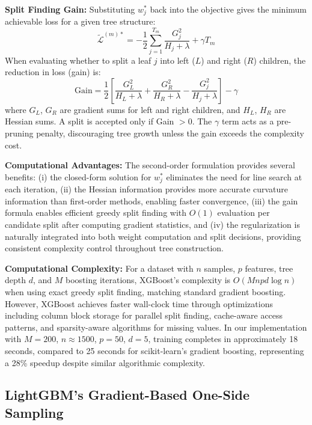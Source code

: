 \documentclass[10pt,twocolumn]{article}
\begin{document}
\textbf{Split Finding Gain:} Substituting $w_j^*$ back into the objective gives the minimum achievable loss for a given tree structure:
\begin{equation}
\tilde{\mathcal{L}}^{(m)*} = -\frac{1}{2}\sum_{j=1}^{T_m} \frac{G_j^2}{H_j + \lambda} + \gamma T_m
\end{equation}
When evaluating whether to split a leaf $j$ into left ($L$) and right ($R$) children, the reduction in loss (gain) is:
\begin{equation}
\text{Gain} = \frac{1}{2}\left[\frac{G_L^2}{H_L + \lambda} + \frac{G_R^2}{H_R + \lambda} - \frac{G_j^2}{H_j + \lambda}\right] - \gamma
\end{equation}
where $G_L$, $G_R$ are gradient sums for left and right children, and $H_L$, $H_R$ are Hessian sums. A split is accepted only if Gain $> 0$. The $\gamma$ term acts as a pre-pruning penalty, discouraging tree growth unless the gain exceeds the complexity cost.

\textbf{Computational Advantages:} The second-order formulation provides several benefits: (i) the closed-form solution for $w_j^*$ eliminates the need for line search at each iteration, (ii) the Hessian information provides more accurate curvature information than first-order methods, enabling faster convergence, (iii) the gain formula enables efficient greedy split finding with $O(1)$ evaluation per candidate split after computing gradient statistics, and (iv) the regularization is naturally integrated into both weight computation and split decisions, providing consistent complexity control throughout tree construction.

\textbf{Computational Complexity:} For a dataset with $n$ samples, $p$ features, tree depth $d$, and $M$ boosting iterations, XGBoost's complexity is $O(Mnpd\log n)$ when using exact greedy split finding, matching standard gradient boosting. However, XGBoost achieves faster wall-clock time through optimizations including column block storage for parallel split finding, cache-aware access patterns, and sparsity-aware algorithms for missing values. In our implementation with $M=200$, $n \approx 1500$, $p=50$, $d=5$, training completes in approximately 18 seconds, compared to 25 seconds for scikit-learn's gradient boosting, representing a 28\% speedup despite similar algorithmic complexity.

\subsection{LightGBM's Gradient-Based One-Side Sampling}
\end{document}
